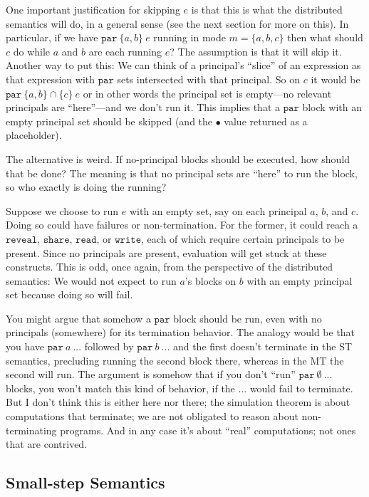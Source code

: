 \documentclass[10pt]{article}
\newcommand{\kw}[1]{\ensuremath{\mathtt{#1}}}
\newcommand{\epar}[2]{\ensuremath{\kw{par}~{#1}~{#2}}}
\newcommand{\vcrash}{\ensuremath{\bullet}}
\begin{document}
One important justification for skipping $e$ is that this is what the
distributed semantics will do, in a general sense (see the next
section for more on this). In particular, if
we have $\epar{\{a,b\}}{e}$ running in mode $m = \{ a, b, c \}$ then
what should $c$ do while $a$ and $b$ are each running $e$? The
assumption is that it will skip it. Another way to put this: We can
think of a principal's ``slice'' of an expression as that expression
with $\kw{par}$ sets intersected with that principal. So on $c$ it
would be $\epar{\{a,b\} \cap \{c\}}{e}$ or in other words the
principal set is empty---no relevant principals are ``here''---and we
don't run it. This implies that a $\kw{par}$ block with an empty
principal set should be skipped (and the $\vcrash$ value returned as a
placeholder). 

The alternative is weird. If no-principal blocks should be executed,
how should that be done? The meaning is that no principal sets are
``here'' to run the block, so who exactly is doing the running? 

Suppose we choose to run $e$ with an empty set, say on each principal
$a$, $b$, and $c$. Doing so could have failures or non-termination. For the
former, it could reach a $\kw{reveal}$, $\kw{share}$, $\kw{read}$,
or $\kw{write}$, each of which require certain principals to be
present. Since no principals are present, evaluation will get stuck
at these constructs. This is odd, once again, from the perspective of
the distributed semantics: We would not expect to run $a$'s blocks on
$b$ with an empty principal set because doing so will fail.

You might argue that somehow a $\kw{par}$ block should be run, even
with no principals (somewhere) for its termination behavior. The
analogy would be that you have $\epar{a}{...}$ followed by
  $\epar{b}{...}$ and the first doesn't terminate in the ST semantics,
  precluding running the second block there, whereas in the MT the
  second will run. The argument is somehow that if you don't ``run''
  $\epar{\emptyset}{...}$ blocks, you won't match this kind of
    behavior, if the $...$ would fail to terminate. But I don't think this
is either here nor there; the simulation theorem is about computations
that terminate; we are not obligated to reason about non-terminating
programs. And in any case it's about ``real'' computations; not ones
that are contrived.

\subsection{Small-step Semantics}
\end{document}
